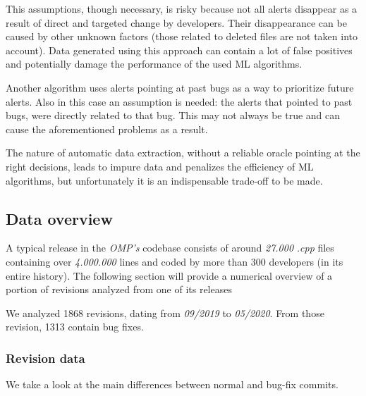 This assumptions, though necessary, is risky because not all alerts disappear as a result of direct and targeted change by developers. Their disappearance can be caused by other unknown factors (those related to deleted files are not taken into account). Data generated using this approach can contain a lot of false positives and potentially damage the performance of the used ML algorithms.

Another algorithm uses alerts pointing at past bugs as a way to prioritize future alerts. Also in this case an assumption is needed: the alerts that pointed to past bugs, were directly related to that bug. This may not always be true and can cause the aforementioned problems as a result.

The nature of automatic data extraction, without a reliable oracle pointing at the right decisions, leads to impure data and penalizes the efficiency of ML algorithms, but unfortunately it is an indispensable trade-off to be made.

\subsection{Data overview}
\label{data_collection:overview}

A typical release in the \textit{OMP's} codebase consists of around \textit{27.000} \textit{.cpp} files containing over \textit{4.000.000} lines and coded by more than 300 developers (in its entire history). The following section will provide a numerical overview of a portion of revisions analyzed from one of its releases 

We analyzed 1868 revisions, dating from \textit{09/2019} to \textit{05/2020}. From those revision, 1313 contain bug fixes. 

\subsubsection{Revision data}
We take a look at the main differences between normal and bug-fix commits.


